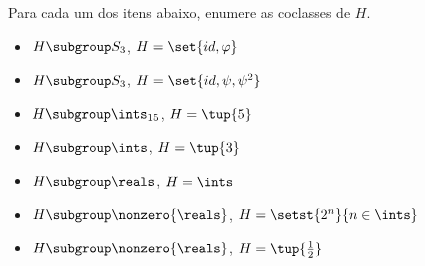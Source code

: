 \begin{exercise}
	Para cada um dos itens abaixo, enumere as coclasses de $H$.
	\begin{itemize}
		\item $H \subgroup S_3$, $H = \set{id, \varphi}$
		\item $H \subgroup S_3$, $H = \set{id, \psi, \psi^2}$
		\item $H \subgroup \ints_{15}$, $H = \tup{5}$
		\item $H \subgroup \ints$, $H = \tup{3}$
		\item $H \subgroup \reals$, $H = \ints$
		\item $H \subgroup \nonzero{\reals}$, $H = \setst{2^n}{n \in \ints}$
		\item $H \subgroup \nonzero{\reals}$, $H = \tup{\frac{1}{2}}$ 
	\end{itemize}
\end{exercise}